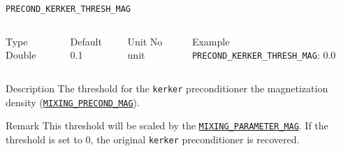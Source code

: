 \documentclass[xcolor=dvipsnames,t]{beamer}
\begin{document}
\begin{frame}[allowframebreaks]{\texttt{PRECOND\_KERKER\_THRESH\_MAG}} \label{PRECOND_KERKER_THRESH_MAG}
\vspace*{-12pt}
\begin{columns}
\begin{block}{Type}
Double
\end{block}

\begin{block}{Default}
0.1
\end{block}

\begin{block}{Unit}
No unit
\end{block}

\begin{block}{Example}
\texttt{PRECOND\_KERKER\_THRESH\_MAG}: 0.0
\end{block}
\end{columns}

\begin{block}{Description}
The threshold for the \texttt{kerker} preconditioner the magnetization density (\hyperlink{MIXING_PRECOND_MAG}{\texttt{MIXING\_PRECOND\_MAG}}). 
\end{block}

\begin{block}{Remark}
This threshold will be scaled by the \hyperlink{MIXING_PARAMETER_MAG}{\texttt{MIXING\_PARAMETER\_MAG}}. If the threshold is set to 0, the original \texttt{kerker} preconditioner is recovered.
\end{block}

\end{frame}




\end{document}
